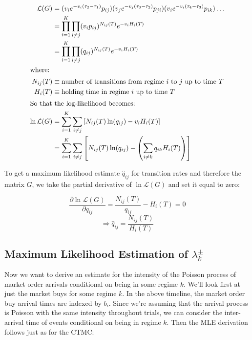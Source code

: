 \begin{align*}
\mathcal{L}(G) &= (v_{i} e^{-v_{i}(\tau_2 - \tau_1)} p_{ij}) (v_{j} e^{-v_{j}(\tau_3 - \tau_2)} p_{ji}) (v_{i} e^{-v_{i}(\tau_4 - \tau_3)} p_{ik}) \dots \\
&= \prod\limits_{i=1}^{K} \prod\limits_{i \neq j} (v_{i}p_{ij})^{N_{ij}(T)} e^{-v_{i}H_i(T)} \\
&= \prod\limits_{i=1}^{K} \prod\limits_{i \neq j} (q_{ij})^{N_{ij}(T)} e^{-v_{i}H_i(T)} \\
\intertext{where:}
N_{ij}(T) & \equiv \mbox{number of transitions from regime $i$ to $j$ up to time $T$} \\
H_{i}(T) & \equiv \mbox{holding time in regime $i$ up to time $T$} \\
\intertext{So that the log-likelihood becomes:} 
\ln \mathcal{L}(G) & = \sum\limits_{i=1}^{K} \sum\limits_{i \neq j} \left[ N_{ij}(T) \ln(q_{ij}) - v_{i} H_i(T) \right] \\
&= \sum\limits_{i=1}^{K} \sum\limits_{i \neq j} \left[ N_{ij}(T) \ln(q_{ij}) - \left( \sum\limits_{i \neq k} q_{ik} H_i(T) \right) \right]
\end{align*}

To get a maximum likelihood estimate $\hat{q}_{ij}$ for transition rates and therefore the matrix $G$, we take the partial derivative of $\ln \mathcal{L}(G)$ and set it equal to zero:

$$\dfrac{\partial \ln \mathcal{L}(G)}{\partial q_{ij}} = \dfrac{N_{ij}(T)}{q_{ij}} - H_i(T) = 0$$
$$ \Rightarrow \hat{q}_{ij} = \dfrac{N_{ij}(T)}{H_i(T)}$$



\subsection{Maximum Likelihood Estimation of \texorpdfstring{$\lambda^{\pm}_k$}{lpmk}}

Now we want to derive an estimate for the intensity of the Poisson process of market order arrivals conditional on being in some regime $k$. We'll look first at just the market buys for some regime $k$. In the above timeline, the market order buy arrival times are indexed by $b_i$. Since we're assuming that the arrival process is Poisson with the same intensity throughout trials, we can consider the inter-arrival time of events conditional on being in regime $k$. Then the MLE derivation follows just as for the CTMC:

